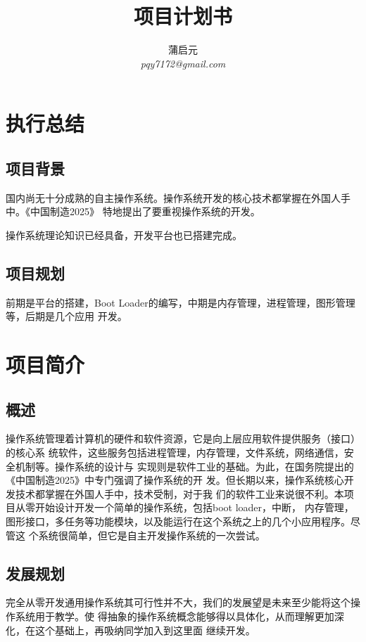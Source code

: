 \documentclass{wx672article} %
\title{项目计划书}
\author{蒲启元 \\
\emph{pqy7172@gmail.com}}
\begin{document}
\maketitle{}

\section{执行总结}

\subsection{项目背景}
国内尚无十分成熟的自主操作系统。操作系统开发的核心技术都掌握在外国人手中。《中国制造2025》
特地提出了要重视操作系统的开发。

操作系统理论知识已经具备，开发平台也已搭建完成。

\subsection{项目规划}

前期是平台的搭建，Boot Loader的编写，中期是内存管理，进程管理，图形管理等，后期是几个应用
开发。

\section{项目简介}

\subsection{概述}

操作系统管理着计算机的硬件和软件资源，它是向上层应用软件提供服务（接口）的核心系
统软件，这些服务包括进程管理，内存管理，文件系统，网络通信，安全机制等。操作系统的设计与
实现则是软件工业的基础。为此，在国务院提出的《中国制造2025》中专门强调了操作系统的开
发。但长期以来，操作系统核心开发技术都掌握在外国人手中，技术受制，对于我
们的软件工业来说很不利。本项目从零开始设计开发一个简单的操作系统，包括boot loader，中断，
内存管理，图形接口，多任务等功能模块，以及能运行在这个系统之上的几个小应用程序。尽管这
个系统很简单，但它是自主开发操作系统的一次尝试。

\subsection{发展规划}

完全从零开发通用操作系统其可行性并不大，我们的发展望是未来至少能将这个操作系统用于教学。使
得抽象的操作系统概念能够得以具体化，从而理解更加深化，在这个基础上，再吸纳同学加入到这里面
继续开发。
\end{document}

